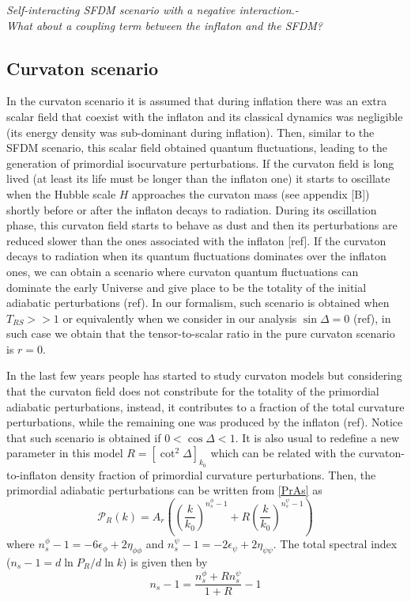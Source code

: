 \documentclass[twocolumn,           %
               showpacs,            %
               preprintnumbers,     %
               aps,                 %
               prl,          	    %
               letterpaper,             %
               superscriptaddress,      %
               nofootinbib,         %
               tightenlines,        %
               floats,floatfix      %
               ,usenatbib,
               ]{revtex4-1}
\begin{document}
\textit{Self-interacting SFDM scenario with a negative interaction.-}
\\

\textit{What about a coupling term between the inflaton and the SFDM?}
\\

\subsection{Curvaton scenario}

In the curvaton scenario it is assumed that during inflation there was an extra scalar field that coexist with the inflaton and its classical dynamics was negligible (its energy density was sub-dominant during inflation). Then, similar to the SFDM scenario, this scalar field obtained quantum fluctuations, leading to the generation of primordial isocurvature perturbations. If the curvaton field is long lived (at least its life must be longer than the inflaton one) it starts to oscillate when the Hubble scale $H$ approaches the curvaton mass (see appendix [B]) shortly before or after the inflaton decays to radiation. During its oscillation phase, this curvaton field starts to behave as dust and then its perturbations are reduced slower than the ones associated with the inflaton [ref]. If the curvaton decays to radiation when its quantum fluctuations dominates over the inflaton ones, we can obtain a scenario where curvaton quantum fluctuations can dominate the early Universe and give place to be the totality of the initial adiabatic perturbations (ref). In our formalism, such scenario is obtained when $T_{RS}>>1$ or equivalently when we consider in our analysis $\sin\Delta = 0$ (ref), in such case we obtain that the tensor-to-scalar ratio in the pure curvaton scenario is $r=0$. 

In the last few years people has started to study curvaton models but considering that the curvaton field does not constribute for the totality of the primordial adiabatic perturbations, instead, it contributes to a fraction of the total curvature perturbations, while the remaining one was produced by the inflaton (ref). Notice that such scenario is obtained if $0<\cos\Delta <1$. It is also usual to redefine a new parameter in this model $R= [\cot^2\Delta]_{k_0}$ which can be related with the curvaton-to-inflaton density fraction of primordial curvature perturbations. Then, the primordial adiabatic perturbations can be written from \eqref{PrAs} as
\begin{equation}\label{PCr}
\mathcal{P}_R(k)=A_r\left(\left(\frac{k}{k_{0}}\right)^{n_s^\phi-1}+R\left(\frac{k}{k_{0}}\right)^{n_s^\psi-1}\right)
\end{equation}
where $n_s^\phi-1 = -6\epsilon_\phi+2\eta_{\phi\phi}$ and $n_s^\psi-1 = -2\epsilon_\psi+2\eta_{\psi\psi}$.
The total spectral index ($n_s-1=d\ln P_R/d\ln k$) is given then by
\begin{equation}
n_s-1=\frac{n_s^\phi+R n_s^\psi}{1+R}-1
\end{equation}
\end{document}
